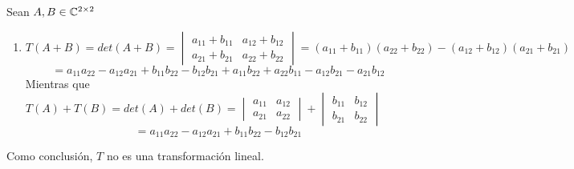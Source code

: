 \begin{enumerate}
            \begin{mdframed}[style=s]
                Sean $A,B\in\mathbb{C}^{2\times2}$
                \begin{enumerate}
                    \item $T(A+B)=det(A+B)=\begin{vmatrix}
                        a_{11}+b_{11}&a_{12}+b_{12}\\a_{21}+b_{21}&a_{22}+b_{22}
                    \end{vmatrix}=(a_{11}+b_{11})(a_{22}+b_{22})-(a_{12}+b_{12})(a_{21}+b_{21})$
                    \[=a_{11}a_{22}-a_{12}a_{21}+b_{11}b_{22}-b_{12}b_{21}+a_{11}b_{22}+a_{22}b_{11}-a_{12}b_{21}-a_{21}b_{12}\]
                        Mientras que $T(A)+T(B)=det(A)+det(B)=\begin{vmatrix}
                            a_{11}&a_{12}\\a_{21}&a_{22}
                        \end{vmatrix}+\begin{vmatrix}
                            b_{11}&b_{12}\\b_{21}&b_{22}
                        \end{vmatrix}$
                        \[=a_{11}a_{22}-a_{12}a_{21}+b_{11}b_{22}-b_{12}b_{21}\]
                \end{enumerate}
                Como conclusión, $T$ no es una transformación lineal.
            \end{mdframed}
    \end{enumerate}